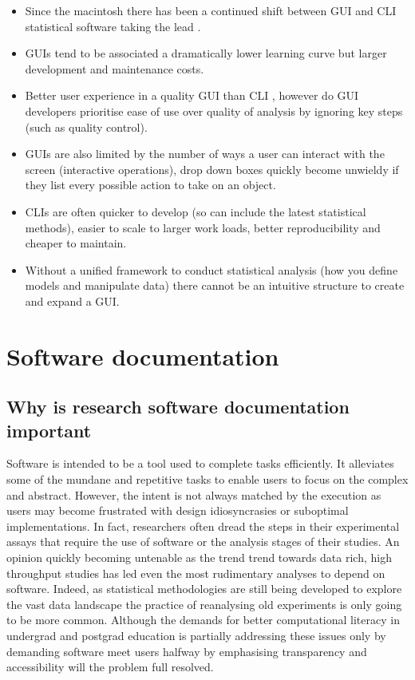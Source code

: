 \documentclass{SBCbookchapter}
\begin{document}
\begin{itemize}
    \item Since the macintosh there has been a continued shift between GUI and CLI statistical software taking the lead \cite{ValeroMora2012}. 
    \item GUIs tend to be associated a dramatically lower learning curve but larger development and maintenance costs.
    \item Better user experience in a quality GUI than CLI \cite{Staggers2000}, however do GUI developers prioritise ease of use over quality of analysis by ignoring key steps (such as quality control).
    \item GUIs are also limited by the number of ways a user can interact with the screen (interactive operations), drop down boxes quickly become unwieldy if they list every possible action to take on an object. 
    \item CLIs are often quicker to develop (so can include the latest statistical methods), easier to scale to larger work loads, better reproducibility and cheaper to maintain.
    \item Without a unified framework to conduct statistical analysis (how you define models and manipulate data) there cannot be an intuitive structure to create and expand a GUI. \cite{Unwin2012}

\end{itemize}

\section{Software documentation}

\subsection{Why is research software documentation important}

Software is intended to be a tool used to complete tasks efficiently.
It alleviates some of the mundane and repetitive tasks to enable users to focus on the complex and abstract. 
However, the intent is not always matched by the execution as users may become frustrated with design idiosyncrasies or suboptimal implementations.
In fact, researchers often dread the steps in their experimental assays that require the use of software or the analysis stages of their studies.
An opinion quickly becoming untenable as the trend trend towards data rich, high throughput studies has led even the most rudimentary analyses to depend on software.
Indeed, as statistical methodologies are still being developed to explore the vast data landscape the practice of reanalysing old experiments is only going to be more common. 
Although the demands for better computational literacy in undergrad and postgrad education is partially addressing these issues only by demanding software meet users halfway by emphasising transparency and accessibility will the problem full resolved.
\end{document}
